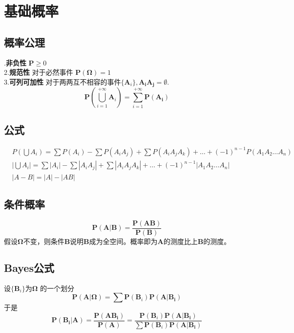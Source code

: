 \documentclass[a4paper]{ctexart}
\begin{document}
\section{基础概率}
\subsection{概率公理}
.\textbf{非负性} $\bm P\ge 0$\\
2.\textbf{规范性} 对于必然事件 $\bm P(\bm \Omega)=1$\\
3.\textbf{可列可加性} 对于两两互不相容的事件$\{\bm A_i\}, \bm{A_iA_j}=\emptyset.$
\begin{equation}
    \bm P(\bigcup_{i=1}^{+\infty} \bm A_i)=\sum_{i=1}^{+\infty} \bm {P(A_i)}
\end{equation}
\subsection{公式}
\begin{align*}
     & P(\bigcup A_i)=\sum P(A_i)-\sum P(A_iA_j)+\sum P(A_iA_jA_k)+\ldots+(-1)^{n-1}P(A_1A_2\ldots A_n) \\
     & |\bigcup A_i|=\sum |A_i|-\sum |A_iA_j|+ \sum |A_iA_jA_k| +\ldots +(-1)^{n-1}|A_1A_2\ldots A_n|   \\
     & |A-B|= |A|-|AB|
\end{align*}
\subsection{条件概率}
\begin{equation}
    \bm P (\bm{A|B})=\frac{\bm P(\bm {AB})}{\bm P(\bm B)}
\end{equation}
假设$\bm \Omega$不变，则条件$\bm B$说明$\bm B$成为全空间。概率即为$\bm A$的测度比上$\bm B$的测度。
\subsection{Bayes公式}
设$\{\bm B_i\}$为$\bm \Omega$ 的一个划分
\begin{equation}
    \bm P(\bm {A|\Omega})=\sum \bm P(\bm B_i)\bm P(\bm {A|B_i})
\end{equation}
于是
\begin{equation}
    \bm P(\bm {B_i|A})=\frac{\bm P (\bm {AB_i})}{\bm P(\bm A)}=\frac{\bm P(\bm B_i)\bm P(\bm {A|B_i})}{\displaystyle \sum \bm P(\bm B_i)\bm P(\bm {A|B_i})}
\end{equation}
\end{document}
